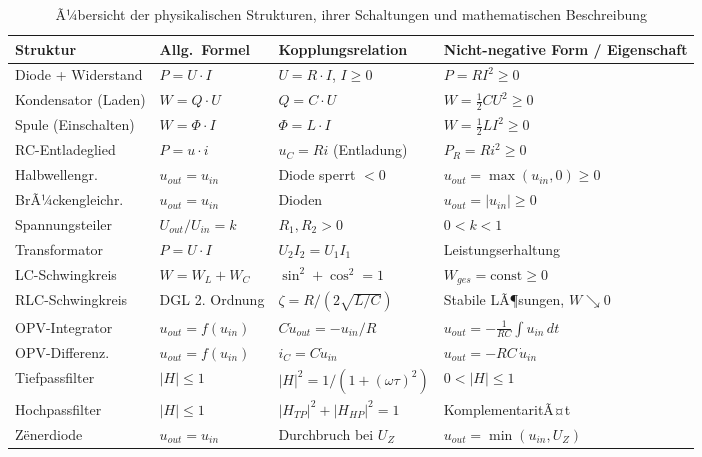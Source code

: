 ﻿\documentclass[12pt, a4paper]{article}
\begin{document}
	\begin{table}[h]
		\centering
		\caption{Ã¼bersicht der physikalischen Strukturen, ihrer Schaltungen und mathematischen Beschreibung}
		\begin{tabular}{>{\raggedright\arraybackslash}p{3cm}>{\raggedright\arraybackslash}p{3cm}>{\raggedright\arraybackslash}p{3cm}>{\raggedright\arraybackslash}p{4cm}}
			\toprule
			\textbf{Struktur} & \textbf{Allg.\ Formel} & \textbf{Kopplungs\-relation} & \textbf{Nicht-negative Form / Eigenschaft} \\
			\midrule
			Diode + Widerstand & $P = U \cdot I$ & $U = R\cdot I$, $I \geq 0$ & $P = R I^2 \geq 0$ \\
			Kondensator (Laden) & $W = Q \cdot U$ & $Q = C \cdot U$ & $W = \tfrac{1}{2}CU^2 \geq 0$ \\
			Spule (Einschalten) & $W = \Phi \cdot I$ & $\Phi = L \cdot I$ & $W = \tfrac{1}{2}LI^2 \geq 0$ \\
			RC-Entladeglied & $P = u \cdot i$ & $u_C = Ri$ (Entladung) & $P_R = Ri^2 \geq 0$ \\
			Halbwellengr. & $u_{out} = u_{in}$ & Diode sperrt $<0$ & $u_{out} = \max(u_{in},0) \geq 0$ \\
			BrÃ¼ckengleichr. & $u_{out} = u_{in}$ & 4 Dioden & $u_{out} = |u_{in}| \geq 0$ \\
			Spannungsteiler & $U_{out}/U_{in} = k$ & $R_1, R_2 > 0$ & $0 < k < 1$ \\
			Transformator & $P = U \cdot I$ & $U_2 I_2 = U_1 I_1$ & Leistungserhaltung \\
			LC-Schwingkreis & $W = W_L + W_C$ & $\sin^2 + \cos^2 = 1$ & $W_{ges} = \text{const} \geq 0$ \\
			RLC-Schwingkreis & DGL 2. Ordnung & $\zeta = R/(2\sqrt{L/C})$ & Stabile LÃ¶sungen, $W \searrow 0$ \\
			OPV-Integrator & $u_{out} = f(u_{in})$ & $C \dot{u}_{out} = -u_{in}/R$ & $u_{out} = -\tfrac{1}{RC}\int u_{in}\,dt$ \\
			OPV-Differenz. & $u_{out} = f(u_{in})$ & $i_C = C\dot{u}_{in}$ & $u_{out} = -RC\,\dot{u}_{in}$ \\
			Tiefpassfilter & $|H| \leq 1$ & $|H|^2 = 1/(1+(\omega\tau)^2)$ & $0 < |H| \leq 1$ \\
			Hochpassfilter & $|H| \leq 1$ & $|H_{TP}|^2 + |H_{HP}|^2 = 1$ & KomplementaritÃ¤t \\
			Z\"{e}nerdiode & $u_{out} = u_{in}$ & Durchbruch bei $U_Z$ & $u_{out} = \min(u_{in}, U_Z)$ \\
			\bottomrule
		\end{tabular}
		\label{tab:uebersicht}
	\end{table}
	
\end{document}
